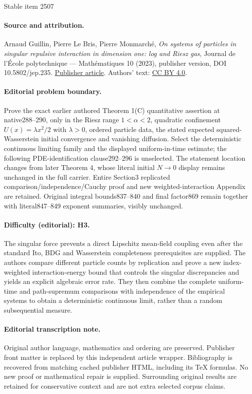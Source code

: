 \documentclass[11pt]{article}
\theoremstyle{plain}
\theoremstyle{definition}
\begin{document}
\begin{center}{\Large Stable item 2507}\end{center}
\paragraph{Source and attribution.}
Arnaud Guillin, Pierre Le Bris, Pierre Monmarché, \emph{On systems of particles in singular repulsive interaction in dimension one: log and Riesz gas}, Journal de l’École polytechnique — Mathématiques 10 (2023), publisher version, DOI 10.5802/jep.235. \href{https://jep.centre-mersenne.org/articles/10.5802/jep.235/}{Publisher article}. Authors' text: \href{https://creativecommons.org/licenses/by/4.0/}{CC BY 4.0}.
\paragraph{Editorial problem boundary.}
Prove the exact earlier authored Theorem 1(C) quantitative assertion at native288--290, only in the Riesz range $1<\alpha<2$, quadratic confinement $U(x)=\lambda x^2/2$ with $\lambda>0$, ordered particle data, the stated expected squared-Wasserstein initial convergence and vanishing diffusion. Select the deterministic continuous limiting family and the displayed uniform-in-time estimate; the following PDE-identification clause292--296 is unselected. The statement location changes from later Theorem 4, whose literal initial $N\to0$ display remains unchanged in the full carrier. Entire Section3 replicated comparison/independence/Cauchy proof and new weighted-interaction Appendix are retained. Original integral bounds837--840 and final factor869 remain together with literal847--849 exponent summaries, visibly unchanged.
\paragraph{Difficulty (editorial): H3.}
The singular force prevents a direct Lipschitz mean-field coupling even after the standard Ito, BDG and Wasserstein completeness prerequisites are supplied. The authors compare different particle counts by replication and prove a new index-weighted interaction-energy bound that controls the singular discrepancies and yields an explicit algebraic error rate. They then combine the complete uniform-time and path-supremum comparisons with independence of the empirical systems to obtain a deterministic continuous limit, rather than a random subsequential measure.
\paragraph{Editorial transcription note.}
Original author language, mathematics and ordering are preserved. Publisher front matter is replaced by this independent article wrapper. Bibliography is recovered from matching cached publisher HTML, including its TeX formulas. No new proof or mathematical repair is supplied. Surrounding original results are retained for conservative context and are not extra selected corpus claims.
\clearpage
\end{document}
